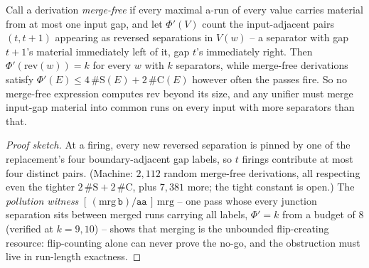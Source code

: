 \begin{lemma}
    \label{dich:lem:SB}
    Call a derivation \emph{merge-free} if every maximal a-run of
    every value carries material from at most one input gap, and let
    $\Phi'(V)$ count the input-adjacent pairs $(t, t+1)$ appearing as
    reversed separations in $V(w)$ -- a separator with gap $t{+}1$'s
    material immediately left of it, gap $t$'s immediately right.
    Then $\Phi'(\mathrm{rev}(w)) = k$ for every $w$ with $k$
    separators, while merge-free derivations satisfy
    $\Phi'(E) \le 4\,\#\mathrm{S}(E) + 2\,\#\mathrm{C}(E)$ however
    often the passes fire.  So no merge-free expression computes
    $\mathrm{rev}$ beyond its size, and any unifier must merge
    input-gap material into common runs on every input with more
    separators than that.
\end{lemma}

\begin{proof}[Proof sketch]
    At a firing, every new reversed separation is pinned by one of the
    replacement's four boundary-adjacent gap labels, so $t$ firings
    contribute at most four distinct pairs.  (Machine: $2{,}112$
    random merge-free derivations, all respecting even the tighter
    $2\,\#\mathrm{S} + 2\,\#\mathrm{C}$, plus $7{,}381$ more; the
    tight constant is open.)  The \emph{pollution witness}
    $[\,(\mathrm{mrg}\,\mathtt b)/\mathtt{aa}\,]\,\mathrm{mrg}$ -- one
    pass whose every junction separation sits between merged runs
    carrying all labels, $\Phi' = k$ from a budget of $8$ (verified at
    $k = 9, 10$) -- shows that merging is the unbounded
    flip-creating resource: flip-counting alone can never prove the
    no-go, and the obstruction must live in run-length exactness.
\end{proof}

